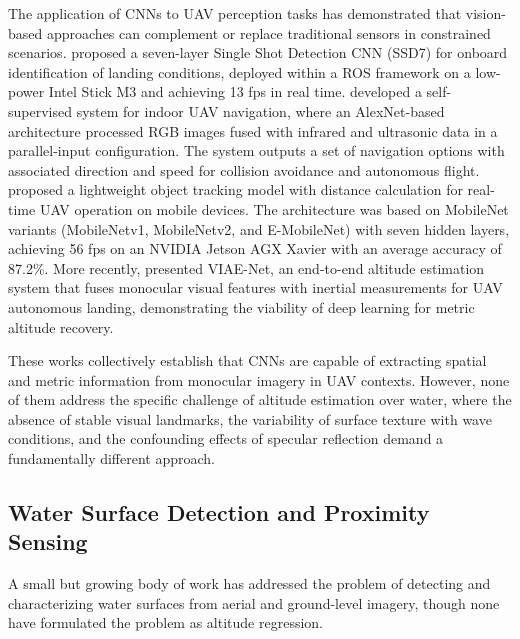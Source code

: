     The application of CNNs to UAV perception tasks has demonstrated that vision-based approaches can complement or replace traditional sensors in constrained scenarios.
    \cite{OnboardCNN} proposed a seven-layer Single Shot Detection CNN (SSD7) for onboard identification of landing conditions, deployed within a ROS framework on a low-power Intel Stick M3 and achieving 13 fps in real time.
    \cite{ByMySelf} developed a self-supervised system for indoor UAV navigation, where an AlexNet-based architecture processed RGB images fused with infrared and ultrasonic data in a parallel-input configuration. The system outputs a set of navigation options with associated direction and speed for collision avoidance and autonomous flight.
    \cite{MobileNetTracking} proposed a lightweight object tracking model with distance calculation for real-time UAV operation on mobile devices.
    The architecture was based on MobileNet variants (MobileNetv1, MobileNetv2, and E-MobileNet) with seven hidden layers, achieving 56 fps on an NVIDIA Jetson AGX Xavier with an average accuracy of 87.2\%.
    More recently, \cite{VIAENetAltitude} presented VIAE-Net, an end-to-end altitude estimation system that fuses monocular visual features with inertial measurements for UAV autonomous landing, demonstrating the viability of deep learning for metric altitude recovery.

    These works collectively establish that CNNs are capable of extracting spatial and metric information from monocular imagery in UAV contexts.
    However, none of them address the specific challenge of altitude estimation over water, where the absence of stable visual landmarks, the variability of surface texture with wave conditions, and the confounding effects of specular reflection demand a fundamentally different approach.

    \subsection{Water Surface Detection and Proximity Sensing}

    A small but growing body of work has addressed the problem of detecting and characterizing water surfaces from aerial and ground-level imagery, though none have formulated the problem as altitude regression.

